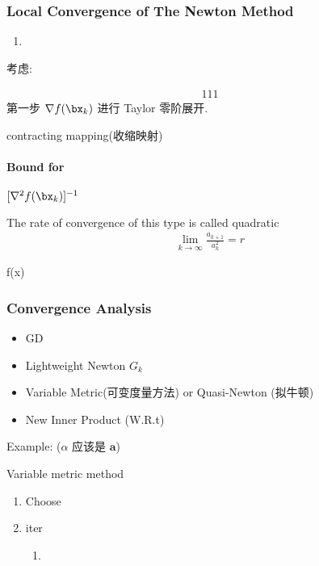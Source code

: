 \subsubsection{Local Convergence of The Newton Method}
\begin{enumerate}
    \item 
\end{enumerate}

考虑: 

\begin{align}
    111
\end{align}
第一步 $\nabla f(\bx_k)$ 进行 Taylor 零阶展开. 

contracting mapping(收缩映射)

\paragraph{Bound for }$[\nabla^2 f(\bx_k)]^{-1}$


The rate of convergence of this type is called quadratic
\begin{align*}
    \lim_{k\to\infty}\frac{a_{k+1}}{a_k^2}=r
\end{align*}

\begin{theorem}
    f(x)
\end{theorem}

\subsubsection{Convergence Analysis}
\begin{itemize}
    \item GD
    \item Lightweight Newton $G_k$
    \item Variable Metric(可变度量方法) or Quasi-Newton (拟牛顿)
    \item New Inner Product (W.R.t)
\end{itemize}

Example: ($\alpha$ 应该是 $\bm a$)

Variable metric method
\begin{enumerate}
    \item Choose
    \item iter
    \begin{enumerate}
        \item 
    \end{enumerate}
\end{enumerate}

